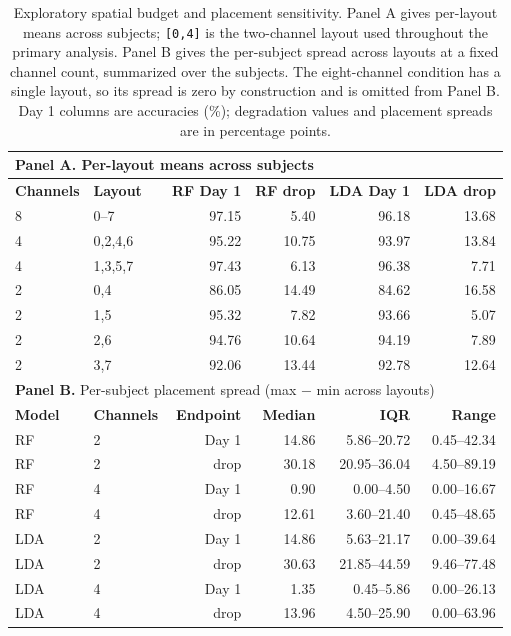 \documentclass[preprint,12pt]{elsarticle}
\begin{document}
\begin{table}[htbp]
    \centering
    \small
    \setlength{\tabcolsep}{4pt}
    \caption{Exploratory spatial budget and placement sensitivity. Panel A gives per-layout means across subjects; \texttt{[0,4]} is the two-channel layout used throughout the primary analysis. Panel B gives the per-subject spread across layouts at a fixed channel count, summarized over the \nSubjects{} subjects. The eight-channel condition has a single layout, so its spread is zero by construction and is omitted from Panel B. Day 1 columns are accuracies (\%); degradation values and placement spreads are in percentage points.}
    \label{tab:spatial_sweep}
    \begin{tabular}{llrrrr}
        \toprule
        \multicolumn{6}{l}{\textbf{Panel A.} Per-layout means across subjects} \\
        \midrule
        \textbf{Channels} & \textbf{Layout} & \textbf{RF Day 1} & \textbf{RF drop} & \textbf{LDA Day 1} & \textbf{LDA drop} \\
        \midrule
        8 & 0--7            & 97.15 & 5.40  & 96.18 & 13.68 \\
        4 & 0,2,4,6         & 95.22 & 10.75 & 93.97 & 13.84 \\
        4 & 1,3,5,7         & 97.43 & 6.13  & 96.38 & 7.71  \\
        2 & 0,4             & 86.05 & 14.49 & 84.62 & 16.58 \\
        2 & 1,5             & 95.32 & 7.82  & 93.66 & 5.07  \\
        2 & 2,6             & 94.76 & 10.64 & 94.19 & 7.89  \\
        2 & 3,7             & 92.06 & 13.44 & 92.78 & 12.64 \\
        \midrule
        \multicolumn{6}{l}{\textbf{Panel B.} Per-subject placement spread (max $-$ min across layouts)} \\
        \midrule
        \textbf{Model} & \textbf{Channels} & \textbf{Endpoint} & \textbf{Median} & \textbf{IQR} & \textbf{Range} \\
        \midrule
        RF  & 2 & Day 1 & 14.86 & 5.86--20.72  & 0.45--42.34 \\
        RF  & 2 & drop  & 30.18 & 20.95--36.04 & 4.50--89.19 \\
        RF  & 4 & Day 1 & 0.90  & 0.00--4.50   & 0.00--16.67 \\
        RF  & 4 & drop  & 12.61 & 3.60--21.40  & 0.45--48.65 \\
        LDA & 2 & Day 1 & 14.86 & 5.63--21.17  & 0.00--39.64 \\
        LDA & 2 & drop  & 30.63 & 21.85--44.59 & 9.46--77.48 \\
        LDA & 4 & Day 1 & 1.35  & 0.45--5.86   & 0.00--26.13 \\
        LDA & 4 & drop  & 13.96 & 4.50--25.90  & 0.00--63.96 \\
        \bottomrule
    \end{tabular}
\end{table}
\end{document}
